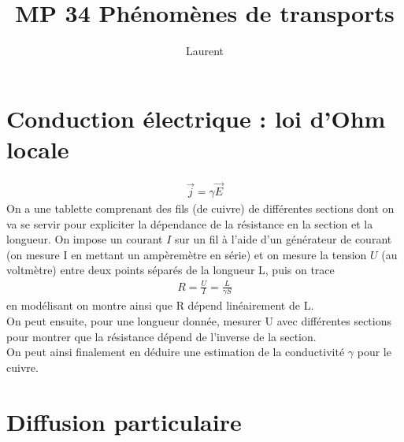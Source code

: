 \documentclass[12pt,prb,aps,epsf]{article}
\begin{document}
	
	\title{MP 34 Phénomènes de transports}
	\author{Laurent}
	
	\maketitle
	
	\tableofcontents
	
	\pagebreak
	
\section{Conduction électrique : loi d'Ohm locale}

\begin{eqnarray}
\vec{j} = \gamma \vec{E}
\end{eqnarray}
On a une tablette comprenant des fils (de cuivre) de différentes sections dont on va se servir pour expliciter la dépendance de la résistance en la section et la longueur.
On impose un courant $I$ sur un fil à l'aide d'un générateur de courant (on mesure I en mettant un ampèremètre en série) et on mesure la tension $U$ (au voltmètre) entre deux points séparés de la longueur L, puis on trace 
\begin{eqnarray}
R = \frac{U}{I} = \frac{L}{\gamma S}
\end{eqnarray}
en modélisant on montre ainsi que R dépend linéairement de L.\\
On peut ensuite, pour une longueur donnée, mesurer U avec différentes sections pour montrer que la résistance dépend de l'inverse de la section.\\
On peut ainsi finalement en déduire une estimation de la conductivité $\gamma$ pour le cuivre.

\section{Diffusion particulaire}
\end{document}
